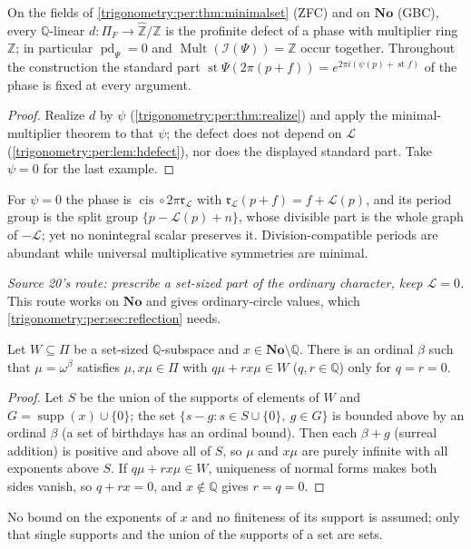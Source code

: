 \documentclass[11pt,letterpaper]{article}
\numberwithin{equation}{section}
\theoremstyle{definition}
\theoremstyle{remark}
\newcommand{\No}{\mathbf{No}}
\newcommand{\Q}{\mathbb Q}
\newcommand{\Z}{\mathbb Z}
\newcommand{\st}{\operatorname{st}}
\newcommand{\supp}{\operatorname{supp}}
\newcommand{\cis}{\operatorname{cis}}
\newcommand{\Mult}{\operatorname{Mult}}
\newcommand{\pd}{\operatorname{pd}}
\newcommand{\Zhat}{\widehat{\Z}}
\newcommand{\cI}{\mathcal I}
\newcommand{\cL}{\mathcal L}
\begin{document}
\begin{corollary}\label{trigonometry:per:cor:simultaneous}
On the fields of \cref{trigonometry:per:thm:minimalset} (ZFC) and on $\No$ (GBC), every $\Q$-linear
$d:\Pi_F\to\Zhat/\Z$ is the profinite defect of a phase with multiplier ring $\Z$; in particular
$\pd_\Psi=0$ and $\Mult(\cI(\Psi))=\Z$ occur together. Throughout the construction the standard part
$\st\Psi(2\pi(p+f))=e^{2\pi i(\psi(p)+\st f)}$ of the phase is fixed at every argument.
\end{corollary}
\begin{proof}
Realize $d$ by $\psi$ (\cref{trigonometry:per:thm:realize}) and apply the minimal-multiplier theorem
to that $\psi$; the defect does not depend on $\cL$ (\cref{trigonometry:per:lem:hdefect}), nor does the
displayed standard part. Take $\psi=0$ for the last example.
\end{proof}
For $\psi=0$ the phase is $\cis\circ2\pi\mathfrak r_{\cL}$ with $\mathfrak r_{\cL}(p+f)=f+\cL(p)$, and
its period group is the split group $\{p-\cL(p)+n\}$, whose divisible part is the whole graph of $-\cL$;
yet no nonintegral scalar preserves it. Division-compatible periods are abundant while universal
multiplicative symmetries are minimal.

\emph{Source 20's route: prescribe a set-sized part of the ordinary character, keep $\cL=0$.} This
route works on $\No$ and gives ordinary-circle values, which
\cref{trigonometry:per:sec:reflection} needs.

\begin{lemma}\label{trigonometry:per:lem:fresh}
Let $W\subseteq\Pi$ be a set-sized $\Q$-subspace and $x\in\No\setminus\Q$. There is an ordinal
$\beta$ such that $\mu=\omega^\beta$ satisfies $\mu,x\mu\in\Pi$ with $q\mu+rx\mu\in W$
($q,r\in\Q$) only for $q=r=0$.
\end{lemma}
\begin{proof}
Let $S$ be the union of the supports of elements of $W$ and $G=\supp(x)\cup\{0\}$; the set
$\{s-g:s\in S\cup\{0\},\ g\in G\}$ is bounded above by an ordinal $\beta$ (a set of birthdays has an
ordinal bound). Then each $\beta+g$ (surreal addition) is positive and above all of $S$, so $\mu$ and
$x\mu$ are purely infinite with all exponents above $S$. If $q\mu+rx\mu\in W$, uniqueness of normal
forms makes both sides vanish, so $q+rx=0$, and $x\notin\Q$ gives $r=q=0$.
\end{proof}
No bound on the exponents of $x$ and no finiteness of its support is assumed; only that single supports
and the union of the supports of a set are sets.
\end{document}
